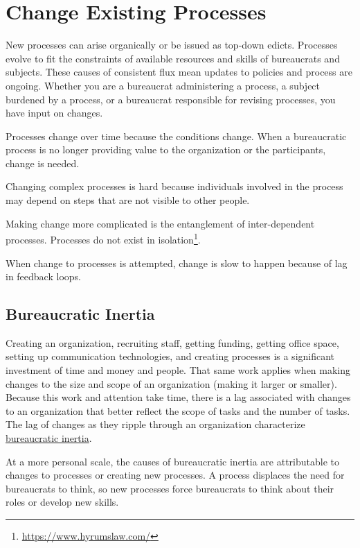 \section{Change Existing Processes\label{sec:change-a-process}}

New processes can arise organically or be issued as top-down edicts. Processes evolve to fit the constraints of available resources and skills of bureaucrats and subjects. These causes of consistent flux mean updates to policies and process are ongoing. Whether you are a bureaucrat administering a process, a subject burdened by a process, or a bureaucrat responsible for revising processes, you have input on changes.



Processes change over time because the conditions change. When a bureaucratic process is no longer providing value to the organization or the participants, change is needed. 

Changing complex processes is hard because individuals involved in the process may depend on steps that are not visible to other people.

Making change more complicated is the entanglement of inter-dependent processes. Processes do not exist in isolation\footnote{\href{https://www.hyrumslaw.com/}{https://www.hyrumslaw.com/}}. %

When change to processes is attempted, change is slow to happen because of lag in feedback loops. 

\subsection*{Bureaucratic Inertia}

Creating an organization, recruiting staff, getting funding, getting office space, setting up communication technologies, and creating processes is a significant investment of time and money and people. 
That same work applies when making changes to the size and scope of an organization (making it larger or smaller). 
Because this work and attention take time, there is a lag associated with changes to an organization that better reflect the scope of tasks and the number of tasks. 
The lag of changes as they ripple through an organization characterize \href{https://en.wikipedia.org/wiki/Bureaucratic_inertia}{bureaucratic inertia}. 

At a more personal scale, the causes of bureaucratic inertia are attributable to changes to processes or creating new processes. A process displaces the need for bureaucrats to think, so new processes force bureaucrats to think about their roles or develop new skills. 


